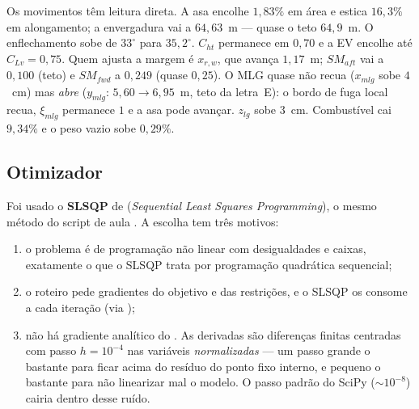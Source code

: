 \begin{table}[H]
\centering
\caption{Restrições normalizadas $g(x)\ge 0$. Uma restrição é
classificada como ativa quando $|g|\le 10^{-4}$.}
\label{tab:con}
\scriptsize

\end{table}

\begin{table}[H]
\centering
\caption{Grandezas dimensionais da partida e do ótimo.}
\label{tab:phys}
\small

\end{table}

Os movimentos têm leitura direta. A asa encolhe $1{,}83\%$ em área e
estica $16{,}3\%$ em alongamento; a envergadura vai a $64{,}63$~m --- quase
o teto $64{,}9$~m. O enflechamento sobe de $33^\circ$ para $35{,}2^\circ$.
$C_{ht}$ permanece em $0{,}70$ e a EV encolhe até $C_{Lv}=0{,}75$.
Quem ajusta a margem é $x_{r,w}$, que avança $1{,}17$~m;
$SM_{aft}$ vai a $0{,}100$ (teto) e $SM_{fwd}$ a $0{,}249$ (quase $0{,}25$).
O MLG quase não recua ($x_{mlg}$ sobe $4$~cm) mas \emph{abre}
($y_{mlg}$: $5{,}60\to 6{,}95$~m, teto da letra~E): o bordo de fuga local
recua, $\xi_{mlg}$ permanece $1$ e a asa pode avançar. $z_{lg}$ sobe
$3$~cm. Combustível cai $9{,}34\%$ e o peso vazio sobe $0{,}29\%$.

\subsection{Otimizador}
\label{sec:p3q4}

Foi usado o \textbf{SLSQP} de 
(\emph{Sequential Least Squares Programming}), o mesmo método do script
de aula . A escolha tem três motivos:

\begin{enumerate}
\item o problema é de programação não linear com desigualdades e
      caixas, exatamente o que o SLSQP trata por programação
      quadrática sequencial;
\item o roteiro pede gradientes do objetivo e das restrições, e o
      SLSQP os consome a cada iteração (via );
\item não há gradiente analítico do . As derivadas são
      diferenças finitas centradas com passo $h=10^{-4}$ nas variáveis
      \emph{normalizadas} --- um passo grande o bastante para ficar acima do
      resíduo do ponto fixo interno, e pequeno o bastante para não
      linearizar mal o modelo. O passo padrão do SciPy ($\sim 10^{-8}$)
      cairia dentro desse ruído.
\end{enumerate}

